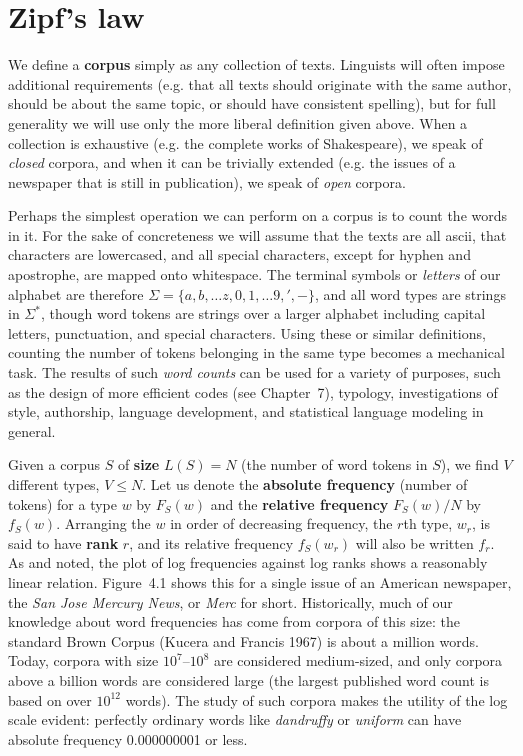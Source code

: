 \section{Zipf's law}

We define a {\bf corpus}  simply as any collection of
texts. Linguists will often impose additional requirements (e.g. that all
texts should originate with the same author, should be about the same topic,
or should have consistent spelling), but for full generality we will use only
the more liberal definition given above. When a collection is exhaustive
(e.g. the complete works of Shakespeare), we speak of {\it closed} corpora, and
when it can be trivially extended (e.g. the issues of a newspaper that is
still in publication), we speak of {\it open} corpora.  

Perhaps the simplest operation we can perform on a corpus is to count the
words in it. For the sake of concreteness we will assume that the texts are
all ascii, that characters are lowercased, and all special characters, except
for hyphen and apostrophe, are mapped onto whitespace. The terminal symbols or
{\it letters} of our alphabet are therefore $\Sigma=\{a, b, \ldots z, 0, 1,
\ldots 9, ', -\}$, and all word types are strings in $\Sigma^*$, though word
tokens are strings over a larger alphabet including capital letters,
punctuation, and special characters. Using these or similar definitions,
counting the number of tokens belonging in the same type becomes a mechanical
task. The results of such {\it word counts} can be used for a variety of
purposes, such as the design of more efficient codes (see Chapter~7),
typology, investigations of style, authorship, language development, and
statistical language modeling in general.

Given a corpus $S$ of {\bf size} $L(S)=N$ (the number of word tokens in $S$),
 we find $V$ different types, $V \leq N$.  Let us
denote the {\bf absolute frequency} (number of tokens) for a type $w$ by
$F_S(w)$ and the {\bf relative frequency} $F_S(w)/N$ by $f_S(w)$.  Arranging
the $w$ in order of decreasing frequency, the $r$th type, $w_r$, is said to
have {\bf rank} $r$, and its relative frequency $f_S(w_r)$ will also be
written $f_r$. As  and  noted, the
plot of log frequencies against log ranks shows a reasonably linear relation.
Figure~4.1 shows this for a single issue of an American newspaper, the {\it
  San Jose Mercury News}, or {\it Merc} for short. Historically, much of our
knowledge about word frequencies has come from corpora of this size: the
standard Brown Corpus (Kucera and Francis 1967)\nocite{Kucera:1967} is about a
million words.  Today, corpora with size $10^7$--$10^8$ are considered
medium-sized, and only corpora above a billion words are considered large (the
largest published word count is based on over $10^{12}$
words).   The
study of such corpora makes the utility of the log scale evident: perfectly
ordinary words like {\it dandruffy} or {\it uniform} can have absolute
frequency 0.000000001 or less.

